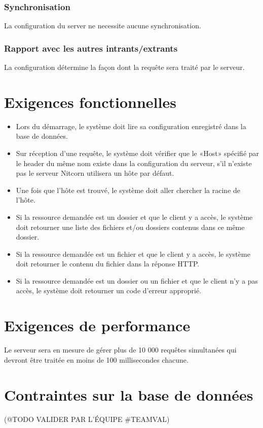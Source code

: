 \documentclass{scrreprt}
\begin{document}
\subsubsection{Synchronisation} La configuration du server ne necessite aucune synchronisation.
\subsubsection{Rapport avec les autres intrants/extrants} La configuration détermine la façon dont la requête sera traité par le serveur.
\section{Exigences fonctionnelles}
\begin{itemize}
    \item Lors du démarrage, le système doit lire sa configuration enregistré dans la base de données.
    \item Sur réception d'une requête, le système doit vérifier que le «Host» spécifié par le header du même nom existe dans la configuration du serveur, s'il n'existe pas
        le serveur Nitcorn utilisera un hôte par défaut.
    \item Une fois que l'hôte est trouvé, le système doit aller chercher la racine de l'hôte.
    \item Si la ressource demandée est un dossier et que le client y a accès, le système doit retourner une liste des fichiers et/ou dossiers contenus dans ce même dossier.
    \item Si la ressource demandée est un fichier et que le client y a accès, le système doit retourner le contenu du fichier dans la réponse HTTP.
    \item Si la ressource demandée est un dossier ou un fichier et que le client n'y a pas accès, le système doit retourner un code d'erreur approprié.
\end{itemize}
\section{Exigences de performance} Le serveur sera en mesure de gérer plus de 10 000 requêtes simultanées qui devront être traitée en moins de 100 millisecondes chacune. 
\section{Contraintes sur la base de données}
(@TODO VALIDER PAR L'ÉQUIPE #TEAMVAL)
\end{document}
